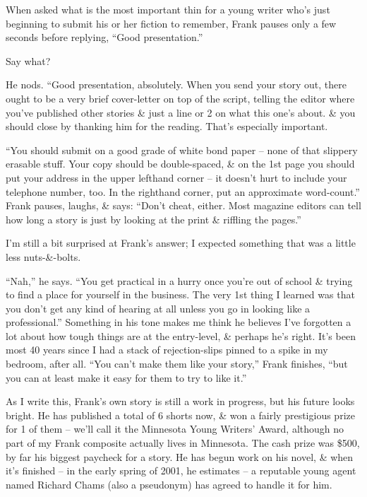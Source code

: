 \documentclass{article}
\numberwithin{equation}{section}
\begin{document}
When asked what is the most important thin for a young writer who's just beginning to submit his or her fiction to remember, Frank pauses only a few seconds before replying, ``Good presentation.''

Say what?

He nods. ``Good presentation, absolutely. When you send your story out, there ought to be a very brief cover-letter on top of the script, telling the editor where you've published other stories \& just a line or 2 on what this one's about. \& you should close by thanking him for the reading. That's especially important.

``You should submit on a good grade of white bond paper -- none of that slippery erasable stuff. Your copy should be double-spaced, \& on the 1st page you should put your address in the upper lefthand corner -- it doesn't hurt to include your telephone number, too. In the righthand corner, put an approximate word-count.'' Frank pauses, laughs, \& says: ``Don't cheat, either. Most magazine editors can tell how long a story is just by looking at the print \& riffling the pages.''

I'm still a bit surprised at Frank's answer; I expected something that was a little less nuts-\&-bolts.

``Nah,'' he says. ``You get practical in a hurry once you're out of school \& trying to find a place for yourself in the business. The very 1st thing I learned was that you don't get any kind of hearing at all unless you go in looking like a professional.'' Something in his tone makes me think he believes I've forgotten a lot about how tough things are at the entry-level, \& perhaps he's right. It's been most 40 years since I had a stack of rejection-slips pinned to a spike in my bedroom, after all. ``You can't make them like your story,'' Frank finishes, ``but you can at least make it easy for them to try to like it.''

As I write this, Frank's own story is still a work in progress, but his future looks bright. He has published a total of 6 shorts now, \& won a fairly prestigious prize for 1 of them -- we'll call it the Minnesota Young Writers' Award, although no part of my Frank composite actually lives in Minnesota. The cash prize was \$500, by far his biggest paycheck for a story. He has begun work on his novel, \& when it's finished -- in the early spring of 2001, he estimates -- a reputable young agent named Richard Chams (also a pseudonym) has agreed to handle it for him.
\end{document}
